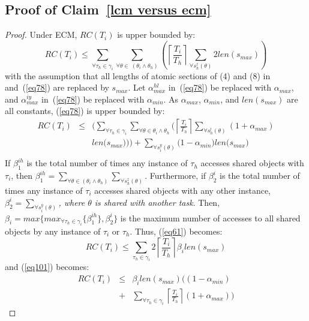 \documentclass[letter]{sig-alternate}
\begin{document}
\subsection{\label{proof_lcm versus ecm}Proof of Claim~\ref{lcm versus ecm}}
\begin{proof}
Under ECM, $RC(T_{i})$ is upper bounded by:
\begin{equation}
RC(T_{i})\le\sum_{\forall \tau_{h}\in\gamma_{i}}\sum_{\forall \theta\in\ (\theta_{i}\wedge\theta_{h})}\left(\left\lceil\frac{T_{i}}{T_{h}}\right\rceil\sum_{\forall s_{h}^{z}(\theta)}2len(s_{max})\right)\label{eq61}\end{equation}
with the assumption that all lengths of atomic sections of (4) and (8) in~\cite{stmconcurrencycontrol:emsoft11} and~(\ref{eq78}) are replaced by $s_{max}$.
Let $\alpha_{max}^{hl}$ in~(\ref{eq78}) be replaced with $\alpha_{max}$, and $\alpha_{max}^{iy}$ in~(\ref{eq78}) be replaced with $\alpha_{min}$. 
As $\alpha_{max}$, $\alpha_{min}$, and $len(s_{max})$ are all constants, (\ref{eq78}) is upper bounded by:
\begin{eqnarray}
RC(T_i) & \le & \Bigg(\sum_{\forall \tau_h \in \gamma_i}\sum_{\forall\theta \in \theta_i \wedge \theta_h}\Bigg(\left\lceil\frac{T_{i}}{T_{h}}\right\rceil\sum_{\forall s_{h}^{l}(\theta)}\left(1+\alpha_{max}\right)\nonumber\\
& & len\Big(s_{max}\Big)\Bigg)\Bigg)
 +  \sum_{\forall s_{i}^{y}(\theta)}\Big(1-\alpha_{min}\Big)len\Big(s_{max}\Big)\nonumber\\ 
\label{eq101}\end{eqnarray}
%
If $\beta_1^{ih}$ is the total number of times any instance of $\tau_h$ accesses shared objects with $\tau_i$, then $\beta_1^{ih}=\sum_{\forall \theta\in(\theta_{i}\wedge\theta_{h})}\sum_{\forall s_{h}^{z}(\theta)}$. Furthermore, if $\beta_2^i$ is the total number of times any instance of $\tau_i$ accesses shared objects with any other instance,   $\beta_2^i=\sum_{\forall s_{i}^{y}(\theta)}$\textit{, where $\theta$ is shared with another task}. Then, $\beta_{i}=max\{max_{\forall \tau_h \in \gamma_i}\{\beta_1^{ih}\},\beta_2^i\}$ is the maximum number of accesses to all shared objects by any instance of $\tau_{i}$ or $\tau_{h}$. 
Thus, (\ref{eq61}) becomes:
\begin{equation}
RC(T_{i})\le\sum_{\tau_{h}\in\gamma_{i}}2\left\lceil\frac{T_{i}}{T_{h}}\right\rceil\beta_{i}len(s_{max})
\label{eq63}\end{equation}
and (\ref{eq101}) becomes:
\begin{eqnarray}
RC(T_{i}) & \le & \beta_{i}len(s_{max}) \Bigg((1-\alpha_{min})\nonumber\\
& + & \sum_{\forall \tau_h \in \gamma_i}\left\lceil\frac{T_{i}}{T_{h}}\right\rceil(1+\alpha_{max})\Bigg)
\label{eq102}\end{eqnarray}


\end{proof}
\end{document}
